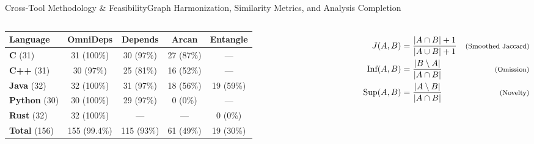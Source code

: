 \documentclass[aspectratio=169,10pt]{beamer}
\begin{document}
\begin{frame}{Cross-Tool Methodology \& Feasibility}{Graph Harmonization, Similarity Metrics, and Analysis Completion}
\begin{columns}[T,onlytextwidth]
      \par\vspace{0.15em}
      {\scriptsize
      \begin{tabular*}{\linewidth}{@{\extracolsep{\fill}}lcccc@{}}
        \toprule
        \textbf{Language} & \textbf{OmniDeps} & \textbf{Depends} & \textbf{Arcan} & \textbf{Entangle} \\
        \midrule
        \textbf{C} (31)      & 31 (100\%)   & 30 (97\%)  & 27 (87\%)  & \color{cookieMuted}--- \\
        \textbf{C++} (31)    & 30 (97\%)    & 25 (81\%)  & 16 (52\%)  & \color{cookieMuted}--- \\
        \textbf{Java} (32)   & 32 (100\%)   & 31 (97\%)  & 18 (56\%)  & 19 (59\%) \\
        \textbf{Python} (30) & 30 (100\%)   & 29 (97\%)  & 0 (0\%)    & \color{cookieMuted}--- \\
        \textbf{Rust} (32)   & 32 (100\%)   & \color{cookieMuted}--- & \color{cookieMuted}--- & 0 (0\%) \\
        \midrule
        \textbf{Total} (156) & 155 (99.4\%) & 115 (93\%) & 61 (49\%)  & 19 (30\%) \\
        \bottomrule
      \end{tabular*}}\par
      \vspace{0.35em}
       \par\vspace{0.15em}
      {\scriptsize\setlength{\abovedisplayskip}{2pt}\setlength{\belowdisplayskip}{2pt}\setlength{\jot}{3pt}
      \begin{align*}
        J(A, B) &= \frac{|A \cap B| + 1}{|A \cup B| + 1} & \text{\footnotesize (Smoothed Jaccard)} \\
        \text{Inf}(A, B) &= \frac{|B \setminus A|}{|A \cap B|} & \text{\footnotesize (Omission)}\\
      \text{Sup}(A, B) &= \frac{|A \setminus B|}{|A \cap B|} & \text{\footnotesize (Novelty)}
      \end{align*}}\par
  \end{columns}
\end{frame}
\end{document}
